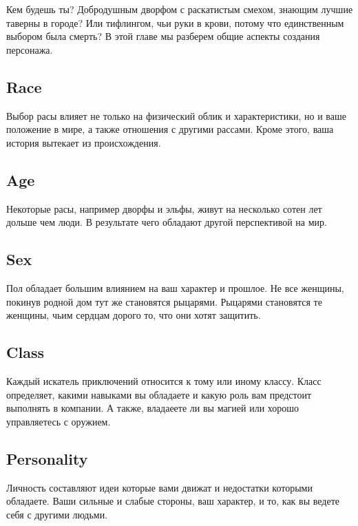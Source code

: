 \documentclass[a4paper,12pt,twocolumn]{book}
\begin{document}
Кем будешь ты? Добродушным дворфом с раскатистым смехом, знающим лучшие таверны в городе? Или тифлингом, чьи руки в крови, потому что единственным выбором была смерть? В этой главе мы разберем общие аспекты создания персонажа.

\subsection{Race}

Выбор расы влияет не только на физический облик и характеристики, но и ваше положение в мире, а также отношения с другими рассами. Кроме этого, ваша история вытекает из происхождения.

\subsection{Age}

Некоторые расы, например дворфы и эльфы, живут на несколько сотен лет дольше чем люди. В результате чего обладают другой перспективой на мир.

\subsection{Sex}

Пол обладает большим влиянием на ваш характер и прошлое. Не все женщины, покинув родной дом тут же становятся рыцарями. Рыцарями становятся те женщины, чьим сердцам дорого то, что они хотят защитить.

\subsection{Class}

Каждый искатель приключений относится к тому или иному классу. Класс определяет, какими навыками вы обладаете и какую роль вам предстоит выполнять в компании. А также, владаеете ли вы магией или хорошо управляетесь с оружием.

\subsection{Personality}

Личность составляют идеи которые вами движат и недостатки которыми обладаете. Ваши сильные и слабые стороны, ваш характер, и то, как вы ведете себя с другими людьми.

\end{document}

